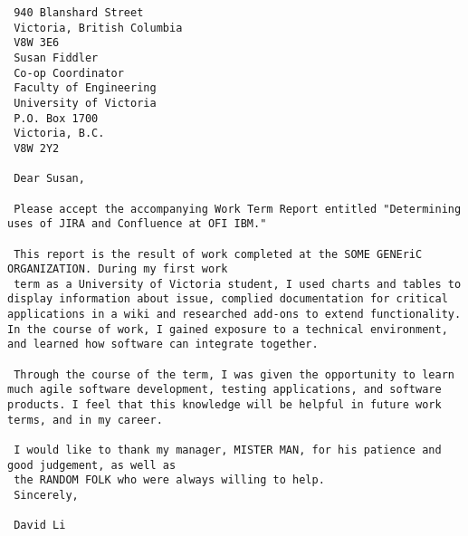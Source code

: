  \linespread{1}
 \begin{verbatim}
 940 Blanshard Street
 Victoria, British Columbia
 V8W 3E6
 Susan Fiddler
 Co-op Coordinator
 Faculty of Engineering
 University of Victoria
 P.O. Box 1700
 Victoria, B.C.
 V8W 2Y2
 
 Dear Susan, 
 
 Please accept the accompanying Work Term Report entitled "Determining uses of JIRA and Confluence at OFI IBM."
 
 This report is the result of work completed at the SOME GENEriC ORGANIZATION. During my first work 
 term as a University of Victoria student, I used charts and tables to display information about issue, complied documentation for critical applications in a wiki and researched add-ons to extend functionality. In the course of work, I gained exposure to a technical environment, and learned how software can integrate together. 
 
 Through the course of the term, I was given the opportunity to learn much agile software development, testing applications, and software products. I feel that this knowledge will be helpful in future work terms, and in my career.
 
 I would like to thank my manager, MISTER MAN, for his patience and good judgement, as well as
 the RANDOM FOLK who were always willing to help.
 Sincerely,

 David Li
 \end{verbatim}
 \fancyhf{} %
